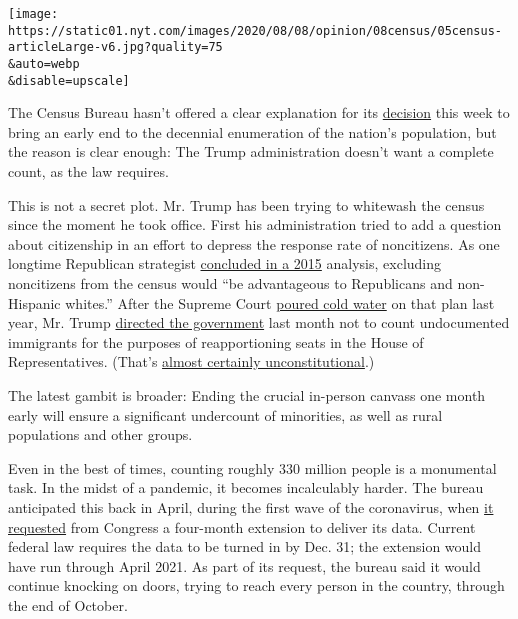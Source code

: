\texttt{[image: https://static01.nyt.com/images/2020/08/08/opinion/08census/05census-articleLarge-v6.jpg?quality=75\\\&auto=webp\\\&disable=upscale]}

The Census Bureau hasn't offered a clear explanation for its
\href{https://www.nytimes.com/2020/08/04/us/2020-census-ending-early.html}{decision}
this week to bring an early end to the decennial enumeration of the
nation's population, but the reason is clear enough: The Trump
administration doesn't want a complete count, as the law requires.

This is not a secret plot. Mr. Trump has been trying to whitewash the
census since the moment he took office. First his administration tried
to add a question about citizenship in an effort to depress the response
rate of noncitizens. As one longtime Republican strategist
\href{https://www.nytimes.com/2019/05/30/us/census-citizenship-question-hofeller.html}{concluded
in a 2015} analysis, excluding noncitizens from the census would ``be
advantageous to Republicans and non-Hispanic whites.'' After the Supreme
Court
\href{https://www.nytimes.com/2019/06/27/us/politics/census-citizenship-question-supreme-court.html}{poured
cold water} on that plan last year, Mr. Trump
\href{https://www.nytimes.com/2020/07/21/us/politics/trump-immigrants-census-redistricting.html}{directed
the government} last month not to count undocumented immigrants for the
purposes of reapportioning seats in the House of Representatives.
(That's
\href{https://www.motherjones.com/politics/2020/07/trumps-new-census-directive-is-almost-certainly-unconstitutional/}{almost
certainly unconstitutional}.)

The latest gambit is broader: Ending the crucial in-person canvass one
month early will ensure a significant undercount of minorities, as well
as rural populations and other groups.

Even in the best of times, counting roughly 330 million people is a
monumental task. In the midst of a pandemic, it becomes incalculably
harder. The bureau anticipated this back in April, during the first wave
of the coronavirus, when
\href{https://www.nytimes.com/2020/04/13/us/census-coronavirus-delay.html?searchResultPosition=12}{it
requested} from Congress a four-month extension to deliver its data.
Current federal law requires the data to be turned in by Dec. 31; the
extension would have run through April 2021. As part of its request, the
bureau said it would continue knocking on doors, trying to reach every
person in the country, through the end of October.

